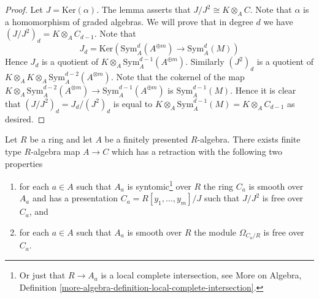 \begin{proof}
Let $J = \text{Ker}(\alpha)$. The lemma asserts that
$J/J^2 \cong K \otimes_A C$. Note that $\alpha$ is a homomorphism
of graded algebras. We will prove that in degree $d$ we have
$(J/J^2)_d = K \otimes_A C_{d - 1}$. Note that
$$
J_d = \text{Ker}(\text{Sym}^d_A(A^{\oplus m}) \to \text{Sym}^d_A(M))
$$
Hence $J_d$ is a quotient of $K \otimes_A \text{Sym}^{d - 1}_A(A^{\oplus m})$.
Similarly $(J^2)_d$ is a quotient of
$K \otimes_A K \otimes_A \text{Sym}^{d - 2}_A(A^{\otimes m})$.
Note that the cokernel of the map
$K \otimes_A \text{Sym}^{d - 2}_A(A^{\otimes m}) \to
\text{Sym}^{d - 1}_A(A^{\oplus m})$ is $\text{Sym}^{d - 1}_A(M)$.
Hence it is clear that $(J/J^2)_d = J_d/(J^2)_d$ is equal to
$K \otimes_A \text{Sym}^{d - 1}_A(M) = K \otimes_A C_{d -1}$ as desired.
\end{proof}

\begin{lemma}
\label{lemma-improve-presentation}
Let $R$ be a ring and let $A$ be a finitely presented $R$-algebra.
There exists finite type $R$-algebra map $A \to C$ which has a
retraction with the following two properties
\begin{enumerate}
\item for each $a \in A$ such that $A_a$ is syntomic\footnote{Or just
that $R \to A_a$ is a local complete intersection, see
More on Algebra, Definition
\ref{more-algebra-definition-local-complete-intersection}.} over $R$
the ring $C_a$ is smooth over $A_a$ and has a presentation
$C_a = R[y_1, \ldots, y_m]/J$ such that $J/J^2$ is free over $C_a$, and
\item for each $a \in A$ such that $A_a$ is smooth over $R$ the
module $\Omega_{C_a/R}$ is free over $C_a$.
\end{enumerate}
\end{lemma}

